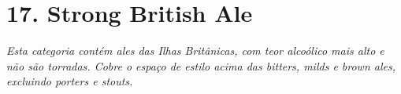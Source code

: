 \section*{17. Strong British Ale}
\textit{Esta categoria contém ales das Ilhas Britânicas, com teor alcoólico mais alto e não são torradas. Cobre o espaço de estilo acima das bitters, milds e brown ales, excluindo porters e stouts.}
